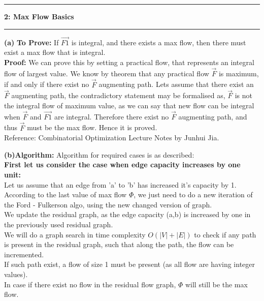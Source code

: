 \documentclass[11pt]{article}
\newcommand\question[2]{\vspace{.25in}\hrule\textbf{#1: #2}\vspace{.5em}\hrule\vspace{.10in}}
\renewcommand\part[1]{\vspace{.10in}\textbf{(#1)}}
\newcommand\algorithm{\vspace{.10in}\textbf{Algorithm: }}
\begin{document}
\question{2}{Max Flow Basics}
\part{a}
{\bf To Prove:} If $\overrightarrow{F1}$ is integral, and there exists a max flow, then there must exist a max flow that is integral.\\[10pt]
{\bf Proof:} We can prove this by setting a practical flow, that represents an integral flow of largest value. We know by theorem that any practical flow $\overrightarrow{F}$ is maximum, if and only if there exist no $\overrightarrow{F}$ augmenting path. Lets assume that there exist an $\overrightarrow{F}$ augmenting path, the contradictory statement may be formalised as, $\overrightarrow{F}$ is not the integral flow of maximum value, as we can say that new flow can be integral when $\overrightarrow{F}$ and $\overrightarrow{F1}$ are integral. Therefore there exist no $\overrightarrow{F}$ augmenting path, and thus $\overrightarrow{F}$ must be the max flow. 
Hence it is proved.\\[10pt]
Reference: Combinatorial Optimization Lecture Notes by Junhui Jia.

\part{b}\algorithm Algorithm for required cases is as described:\\[10pt]
{\bf First let us consider the case when edge capacity increases by one unit:}\\
Let us assume that an edge from 'a' to 'b' has increased it's capacity by 1.\\ According to the last value of max flow $\Phi$, we just need to do a new iteration of the Ford - Fulkerson algo, using the new changed version of graph.\\ We update the residual graph, as the edge capacity (a,b) is increased by one in the previously used residual graph.\\
We will do a graph search in time complexity $O(|V|+|E|)$ to check if any path is present in the residual graph, such that along the path, the flow can be incremented.\\
If such path exist, a flow of size 1 must be present (as all flow are having integer values).\\
In case if there exist no flow in the residual flow graph, $\Phi$ will still be the max flow.\\[10pt]
\end{document}
